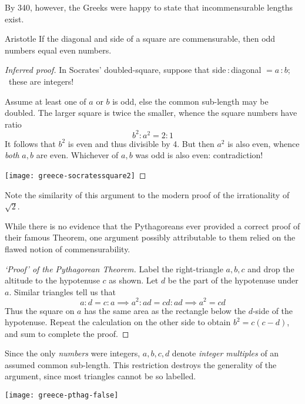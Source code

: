 By 340\BC, however, the Greeks were happy to state that incommensurable lengths exist.

\begin{thm*}{Aristotle}
	If the diagonal and side of a square are commensurable, then odd numbers equal even numbers.
\end{thm*}

\begin{proof}[Inferred proof]
	In Socrates' doubled-square, suppose that side\,:\,diagonal $=a$\,:\,$b$; \ these are integers!\par
	\begin{minipage}[t]{0.8\linewidth}\vspace{-5pt}
		Assume at least one of $a$ or $b$ is odd, else the common sub-length may be doubled. The larger square is twice the smaller, whence the square numbers have ratio
		\[
			b^2:a^2=2:1
		\]
		It follows that $b^2$ is even and thus divisible by 4. But then $a^2$ is also even, whence \emph{both} $a,b$ are even. Whichever of $a,b$ was odd is also even: contradiction!
	\end{minipage}
	\hfill
	\begin{minipage}[t]{0.18\linewidth}\vspace{-8pt}
		\flushright
		\texttt{[image: greece-socratessquare2]}
	\end{minipage}
\end{proof}
Note the similarity of this argument to the modern proof of the irrationality of $\sqrt 2$.\goodbreak

While there is no evidence that the Pythagoreans ever provided a correct proof of their famous Theorem, one argument possibly attributable to them relied on the flawed notion of commensurability.

\begin{minipage}[t]{0.68\linewidth}\vspace{0pt}
	\begin{proof}[`Proof' of the Pythagorean Theorem]\label{pg:pythwrong}
		Label the right-triangle $a,b,c$ and drop the altitude to the hypotenuse $c$ as shown. Let $d$ be the part of the hypotenuse under $a$. Similar triangles tell us that
		\[
			a:d=c:a\implies a^2:ad=cd:ad\implies a^2=cd
		\]
		Thus the square on $a$ has the same area as the rectangle below the $d$-side of the hypotenuse. Repeat the calculation on the other side to obtain $b^2=c(c-d)$, and sum to complete the proof.
	\end{proof}

	Since the only \emph{numbers} were integers, $a,b,c,d$ denote \emph{integer multiples} of an assumed common sub-length. This restriction destroys the generality of the argument, since most triangles cannot be so labelled.
\end{minipage}
\hfill
\begin{minipage}[t]{0.3\linewidth}\vspace{0pt}
	\flushright
	\texttt{[image: greece-pthag-false]}\label{pthagorig}
\end{minipage}
\smallbreak

